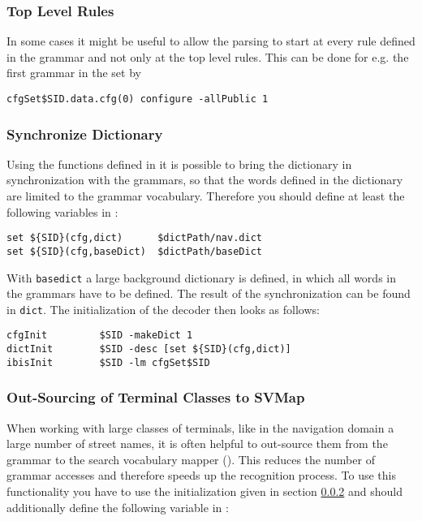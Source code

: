 \subsubsection{Top Level Rules}

In some cases it might be useful to allow the parsing to start at
every rule defined in the grammar and not only at the top level rules.
This can be done for e.g. the first grammar in the set by

\begin{verbatim}
cfgSet$SID.data.cfg(0) configure -allPublic 1
\end{verbatim}


\subsubsection{Synchronize Dictionary} \label{advanced:cfg:dict}

Using the functions defined  in  it is possible  to
bring the dictionary in synchronization with the grammars, so that the
words defined in the dictionary are limited to the grammar vocabulary.
Therefore you should define at least the following variables in
:

\begin{verbatim}
set ${SID}(cfg,dict)      $dictPath/nav.dict
set ${SID}(cfg,baseDict)  $dictPath/baseDict
\end{verbatim}

With \texttt{basedict} a large background dictionary is defined, in
which all words in the grammars have to be defined. The result of the
synchronization can be found in \texttt{dict}. The initialization of
the decoder then looks as follows:

\begin{verbatim}
cfgInit         $SID -makeDict 1
dictInit        $SID -desc [set ${SID}(cfg,dict)]
ibisInit        $SID -lm cfgSet$SID
\end{verbatim}


\subsubsection{Out-Sourcing of Terminal Classes to SVMap}
\label{cfg:classes}

When working with  large classes of  terminals, like in the navigation
domain a   large  number of  street names,   it  is  often  helpful to
out-source them   from  the grammar to   the   search vocabulary mapper
().  This reduces  the  number of grammar accesses
and   therefore  speeds  up the  recognition   process.   To use  this
functionality you have to  use  the  initialization given in   section
\ref{advanced:cfg:dict} and  should additionally  define the following
variable in :

